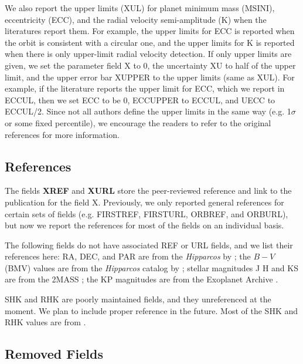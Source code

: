 \documentclass[11pt,preprint]{aastex}
\begin{document}
\begin{CJK*}{UTF8}{gbsn}
We also report the upper limits (XUL) for planet minimum mass (MSINI),
eccentricity (ECC), and the radial velocity semi-amplitude (K) when
the literatures report them. For example, the upper limits for ECC is
reported when the orbit is consistent with a circular one, and the
upper limits for K is reported when there is only upper-limit radial
velocity detection. If only upper limits are given, we set the
parameter field X to 0, the uncertainty XU to half of the upper limit,
and the upper error bar XUPPER to the upper limits (same as XUL). For
example, if the literature reports the upper limit for ECC, which we
report in ECCUL, then we set ECC to be 0, ECCUPPER to ECCUL, and UECC
to ECCUL/2. Since not all authors define the upper limits in the same
way (e.g. 1$\sigma$ or some fixed percentile), we encourage the
readers to refer to the original references for more information.


\subsection{References}\label{sec:ref}

The fields {\bf XREF} and {\bf XURL} store the peer-reviewed reference
and link to the publication for the field X. Previously, we only
reported general references for certain sets of fields (e.g. FIRSTREF,
FIRSTURL, ORBREF, and ORBURL), but now we report the references for
most of the fields on an individual basis.

The following fields do not have associated REF or URL fields, and we
list their references here: RA, DEC, and PAR are from the
\textit{Hipparcos} by \cite{van Leeuwen2009}; the $B-V$ (BMV) values
are from the \textit{Hipparcos} catalog by \cite{Perryman1997};
stellar magnitudes J H and KS are from the 2MASS
\citep{Skrutskie2006}; the KP magnitudes are from the Exoplanet
Archive \citep{Akeson2013}.

SHK and RHK are poorly maintained fields, and they unreferenced at the
moment. We plan to include proper reference in the future. Most of the
SHK and RHK values are from \cite{Butler2006}.

\subsection{Removed Fields}\label{sec:removed}


\end{CJK*}
\end{document}

